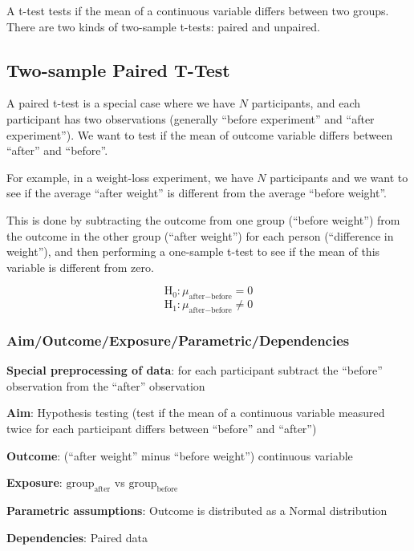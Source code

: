 \documentclass[12pt,]{article}
\begin{document}
A t-test tests if the mean of a continuous variable differs between two
groups. There are two kinds of two-sample t-tests: paired and unpaired.

\subsection{Two-sample Paired T-Test}\label{two-sample-paired-t-test}

A paired t-test is a special case where we have \(N\) participants, and
each participant has two observations (generally ``before experiment''
and ``after experiment''). We want to test if the mean of outcome
variable differs between ``after'' and ``before''.

For example, in a weight-loss experiment, we have \(N\) participants and
we want to see if the average ``after weight'' is different from the
average ``before weight''.

This is done by subtracting the outcome from one group (``before
weight'') from the outcome in the other group (``after weight'') for
each person (``difference in weight''), and then performing a one-sample
t-test to see if the mean of this variable is different from zero.

\[\text{H}_0: \mu_{\text{after}-\text{before}} = 0\]
\[\text{H}_1: \mu_{\text{after}-\text{before}} \ne 0\]

\subsubsection{Aim/Outcome/Exposure/Parametric/Dependencies}\label{aimoutcomeexposureparametricdependencies-2}

\textbf{Special preprocessing of data}: for each participant subtract
the ``before'' observation from the ``after'' observation

\textbf{Aim}: Hypothesis testing (test if the mean of a continuous
variable measured twice for each participant differs between ``before''
and ``after'')

\textbf{Outcome}: (``after weight'' minus ``before weight'') continuous
variable

\textbf{Exposure}: \(\text{group}_\text{after}\) vs
\(\text{group}_\text{before}\)

\textbf{Parametric assumptions}: Outcome is distributed as a Normal
distribution

\textbf{Dependencies}: Paired data

\newpage
\end{document}
